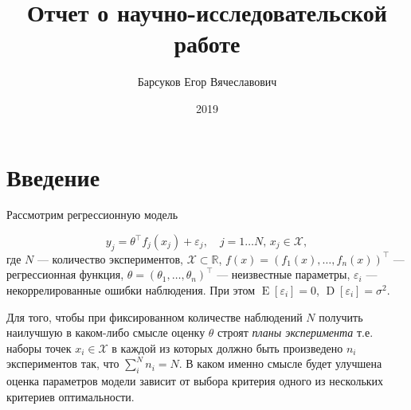 \documentclass[specialist,
               substylefile = spbu.rtx,
               subf,href,colorlinks=true, 12pt]{disser}
\theoremstyle{definition}
\DeclareMathOperator*{\E}{\mathrm{E}}
\DeclareMathOperator*{\D}{\mathrm{D}}
\begin{document}

\title{Отчет о научно-исследовательской работе}


\author{Барсуков Егор Вячеславович}



\date{2019}

\maketitle

\tableofcontents

\chapter*{Введение}

  Рассмотрим регрессионную модель

  \begin{equation}
  \label{eq:regres}
    y_j = \theta^\top f_j(x_j) + \varepsilon_j, \quad j = 1 \ldots N, \, x_j \in \mathcal{X},
  \end{equation}
  где $N$ --- количество экспериментов, $\mathcal{X} \subset \mathbb{R}$, $f(x) = \left(f_1(x), \ldots, f_n(x) \right)^\top$ --- регрессионная функция, $\theta = \left( \theta_1, \ldots, \theta_n \right)^\top$ --- неизвестные параметры, $\varepsilon_i$ ---  некоррелированные ошибки наблюдения. При этом $\E [\varepsilon_i] = 0$, $\D [\varepsilon_i] = \sigma^2$.
  
  Для того, чтобы при фиксированном количестве наблюдений $N$ получить наилучшую в каком-либо смысле оценку $\theta$ строят \textit{планы эксперимента} т.е. наборы точек $x_i \in \mathcal{X}$ в каждой из которых должно быть произведено $n_i$ экспериментов так, что $\sum^N_i n_i = N$. В каком именно смысле будет улучшена оценка параметров модели зависит от выбора критерия одного из нескольких критериев оптимальности.
  
\end{document}
